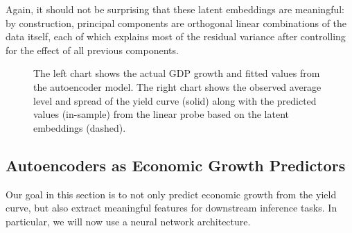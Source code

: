 \documentclass{article}
\theoremstyle{plain}
\theoremstyle{definition}
\theoremstyle{remark}
\begin{document}
Again, it should not be surprising that these latent embeddings are meaningful: by construction, principal components are orthogonal linear combinations of the data itself, each of which explains most of the residual variance after controlling for the effect of all previous components.

\begin{figure}


\caption{\label{fig-dl-results}The left chart shows the actual GDP growth
and fitted values from the autoencoder model. The right chart shows the
observed average level and spread of the yield curve (solid) along with
the predicted values (in-sample) from the linear probe based on the latent embeddings
(dashed).}

\end{figure}%
\subsection{Autoencoders as Economic Growth Predictors}\label{example-deep-learning}


Our goal in this section is to not only predict economic growth from the yield curve, but also extract meaningful features for downstream inference tasks. In particular, we will now use a neural network architecture.
\end{document}
